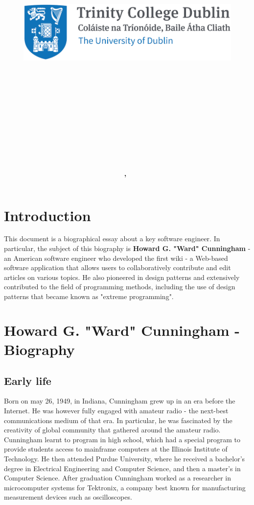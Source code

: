 \documentclass[11pt]{article}
\title{
\vspace{-1in}
\begin{figure}[!ht]
\flushleft
\includegraphics[width=0.4\linewidth]{reduced-trinity.png}
\end{figure}
\vspace{-0.5cm}
\hrulefill \\
\vspace{0.5cm}
\textmd{\textbf{\moduleCode\ \moduleName}}\\
\textmd{\textbf{\assignmentTitle}}\\
\vspace{0.5cm}
\hrulefill \\
}
\author{\textbf{\authorName,\ \authorID}}
\date{\reportDate}
\begin{document}
\lstset{language=Java, captionpos=b, frame=single}
\captionsetup{width=.8\linewidth} 

\maketitle
\tableofcontents
\vspace{0.5in}

\section{Introduction}
\label{sec:Intro}
This document is a biographical essay about a key software engineer. In particular, the subject of this biography is \textbf{Howard G. "Ward" Cunningham} - an American software engineer who developed the first wiki - a Web-based  software  application  that  allows  users  to  collaboratively  contribute  and  edit  articles  on  various  topics.\cite{cs-encyclopedia} He also pioneered in design patterns and extensively contributed to the field of programming methods, including the use of design patterns that became known as "extreme programming".
 
\section{Howard G. "Ward" Cunningham - Biography}
\subsection{Early life}
\par
Born on may 26, 1949, in Indiana, Cunningham grew up in an era before the Internet. He was however fully engaged with amateur radio - the next-best communications medium of that era. In particular, he was fascinated by the creativity of global community that gathered around the amateur radio. Cunningham learnt to program in high school, which had a special program to provide students access to mainframe computers at the Illinois Institute of Technology.\cite{wiki-revolution}\cite{innovators} He then attended Purdue University, where he received a bachelor’s degree in Electrical Engineering and Computer  Science,  and  then  a  master’s  in  Computer  Science. After  graduation  Cunningham  worked  as  a  researcher  in microcomputer  systems  for  Tektronix, a company best known for manufacturing measurement devices such as oscilloscopes. \cite{cs-encyclopedia}
\end{document}
